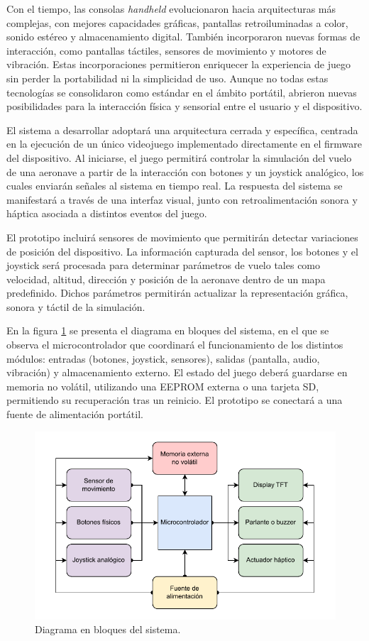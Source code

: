 \documentclass[
11pt, %
]{charter}
\begin{document}
Con el tiempo, las consolas \textit{handheld} evolucionaron hacia arquitecturas más complejas, con mejores capacidades gráficas, pantallas retroiluminadas a color, sonido estéreo y almacenamiento digital. También incorporaron nuevas formas de interacción, como pantallas táctiles, sensores de movimiento y motores de vibración. Estas incorporaciones permitieron enriquecer la experiencia de juego sin perder la portabilidad ni la simplicidad de uso. Aunque no todas estas tecnologías se consolidaron como estándar en el ámbito portátil, abrieron nuevas posibilidades para la interacción física y sensorial entre el usuario y el dispositivo.


El sistema a desarrollar adoptará una arquitectura cerrada y específica, centrada en la ejecución de un único videojuego implementado directamente en el firmware del dispositivo. Al iniciarse, el juego permitirá controlar la simulación del vuelo de una aeronave a partir de la interacción con botones y un joystick analógico, los cuales enviarán señales al sistema en tiempo real. La respuesta del sistema se manifestará a través de una interfaz visual, junto con retroalimentación sonora y háptica asociada a distintos eventos del juego.

El prototipo incluirá sensores de movimiento que permitirán detectar variaciones de posición del dispositivo. La información capturada del sensor, los botones y el joystick será procesada para determinar parámetros de vuelo tales como velocidad, altitud, dirección y posición de la aeronave dentro de un mapa predefinido. Dichos parámetros permitirán actualizar la representación gráfica, sonora y táctil de la simulación. 

En la figura \ref{fig:diagBloques} se presenta el diagrama en bloques del sistema, en el que se observa el microcontrolador que coordinará el funcionamiento de los distintos módulos: entradas (botones, joystick, sensores), salidas (pantalla, audio, vibración) y almacenamiento externo. El estado del juego deberá guardarse en memoria no volátil, utilizando una EEPROM externa o una tarjeta SD, permitiendo su recuperación tras un reinicio. El prototipo se conectará a una fuente de alimentación portátil.

\begin{figure}[htpb]
\centering 
\includegraphics[width=.85\textwidth]{../Figuras/diagrama_bloques_proyecto.pdf}
\caption{Diagrama en bloques del sistema.}
\label{fig:diagBloques}
\end{figure}
\end{document}
